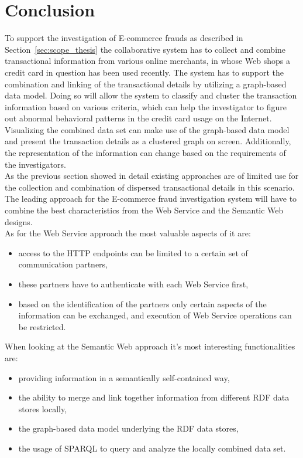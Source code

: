 
\section{Conclusion}
\label{sec:concept_conclusion}

To support the investigation of \gls{E-commerce} frauds as described in Section~\ref{sec:scope_thesis} the collaborative system has to collect and combine transactional information from various online merchants, in whose Web shops a credit card in question has been used recently. The system has to support the combination and linking of the transactional details by utilizing a graph-based data model. Doing so will allow the system to classify and cluster the transaction information based on various criteria, which can help the investigator to figure out abnormal behavioral patterns in the credit card usage on the Internet. Visualizing the combined data set can make use of the graph-based data model and present the transaction details as a clustered graph on screen. Additionally, the representation of the information can change based on the requirements of the investigators. \\

As the previous section showed in detail existing approaches are of limited use for the collection and combination of dispersed transactional details in this scenario. The leading approach for the \gls{E-commerce} fraud investigation system will have to combine the best characteristics from the Web Service and the Semantic Web designs. \\

As for the Web Service approach the most valuable aspects of it are: \@

\begin{itemize}
	\item access to the \gls{HTTP} endpoints can be limited to a certain set of communication partners,
	\item these partners have to authenticate with each Web Service first,
	\item based on the identification of the partners only certain aspects of the information can be exchanged, and execution of Web Service operations can be restricted.
\end{itemize}

When looking at the Semantic Web approach it's most interesting functionalities are: \@

\begin{itemize}
	\item providing information in a semantically self-contained way,
	\item the ability to merge and link together information from different \gls{RDF} data stores locally,
	\item the graph-based data model underlying the \gls{RDF} data stores,
	\item the usage of \gls{SPARQL} to query and analyze the locally combined data set.
\end{itemize}

